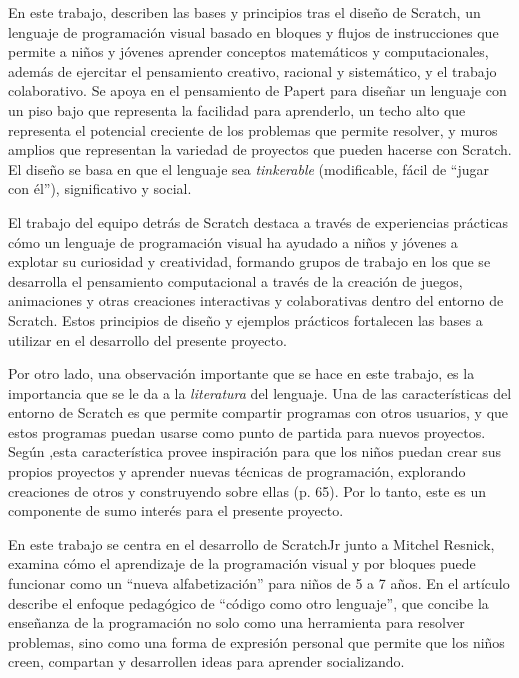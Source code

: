 

En este trabajo,  describen las bases y principios tras el diseño de Scratch, un lenguaje de programación visual basado en bloques y flujos de instrucciones que permite a niños y jóvenes aprender conceptos matemáticos y computacionales, además de ejercitar el pensamiento creativo, racional y sistemático, y el trabajo colaborativo. Se apoya en el pensamiento de Papert para diseñar un lenguaje con un piso bajo que representa la facilidad para aprenderlo, un techo alto que representa el potencial creciente de los problemas que permite resolver, y muros amplios que representan la variedad de proyectos que pueden hacerse con Scratch. El diseño se basa en que el lenguaje sea \emph{tinkerable} (modificable, fácil de “jugar con él”), significativo y social.

El trabajo del equipo detrás de Scratch destaca a través de experiencias prácticas cómo un lenguaje de programación visual ha ayudado a niños y jóvenes a explotar su curiosidad y creatividad, formando grupos de trabajo en los que se desarrolla el pensamiento computacional a través de la creación de juegos, animaciones y otras creaciones interactivas y colaborativas dentro del entorno de Scratch. Estos principios de diseño y ejemplos prácticos fortalecen las bases a utilizar en el desarrollo del presente proyecto.

Por otro lado, una observación importante que se hace en este trabajo, es la importancia que se le da a la \emph{literatura} del lenguaje. Una de las características del entorno de Scratch es que permite compartir programas con otros usuarios, y que estos programas puedan usarse como punto de partida para nuevos proyectos. Según ,esta característica provee inspiración para que los niños puedan crear sus propios proyectos y aprender nuevas técnicas de programación, explorando creaciones de otros y construyendo sobre ellas (p. 65). Por lo tanto, este es un componente de sumo interés para el presente proyecto.


En este trabajo  se centra en el desarrollo de ScratchJr junto a Mitchel Resnick, examina cómo el aprendizaje de la programación visual y por bloques puede funcionar como un “nueva alfabetización” para niños de 5 a 7 años. En el artículo describe el enfoque pedagógico de “código como otro lenguaje”, que concibe la enseñanza de la programación no solo como una herramienta para resolver problemas, sino como una forma de expresión personal que permite que los niños creen, compartan y desarrollen ideas para aprender socializando.

